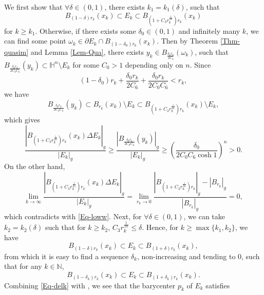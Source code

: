 \documentclass[11pt,reqno]{amsart}
\theoremstyle{definition}
\theoremstyle{remark}
\numberwithin{equation}{section}
\renewcommand{\(}{\left(}
\renewcommand{\)}{\right)}
\renewcommand{\-}{\overline}
\begin{document}
 We first show that $\forall \delta\in(0,1)$, there exists $k_1=k_1(\delta)$, such that 
 \begin{equation}
 	B_{(1-\delta)r_k}(x_k)\subset E_k\subset  B_{(1+C_3 r_k^{\frac{1}{2n}})r_k}(x_k)
 \end{equation}
 for $k\geq k_1$. Otherwise, if there exists some $\delta_0\in(0,1)$ and infinitely many $k$, we can find some point $\omega_k\in\partial E_k\cap B_{(1-\delta_0)r_k}(x_k)$. Then by Theorem \ref{Thm-quasim} and Lemma \ref{Lem-Qua}, there exists $y_k\in B_{\frac{\delta_0 r_k}{2C_6}}(\omega_k)$, such that $B_{\frac{\delta_0 r_k}{2C_0C_6}}(y_k)\subset\mathbb{H}^n\setminus E_k$ for some $C_0>1$ depending only on $n$. Since 
\begin{equation*}
	(1-\delta_0)r_k+\frac{\delta_0 r_k}{2C_6}+\frac{\delta_0 r_k}{2C_0C_6}<r_k,
\end{equation*}
we have 
\begin{equation*}
	B_{\frac{\delta_0 r_k}{2C_0C_6}}(y_k)\subset B_{r_k}(x_k)\setminus {E_k}\subset B_{(1+C_3 r_k^{\frac{1}{2n}})r_k}(x_k)\setminus E_k,
\end{equation*}
which gives
\begin{equation}\label{Eq-loww}
	\frac{\left|B_{(1+C_3 r_k^{\frac{1}{2n}})r_k}(x_k)\Delta E_k\right|_g}{|E_k|_g}\geq \frac{\left|B_{\frac{\delta_0 r_k}{2C_0C_6}}(y_k)\right|_g}{|E_k|_g}\geq\left(\frac{\delta_0}{2C_0C_6\cosh 1}\right)^n>0.
\end{equation}
On the other hand, 
\begin{equation*}
	\lim_{k\to\infty}\frac{\left|B_{(1+C_3 r_k^{\frac{1}{2n}})r_k}(x_k)\Delta E_k\right|_g}{|E_k|_g}=\lim_{r_k\to 0}\frac{\left|B_{(1+C_3 r_k^{\frac{1}{2n}})r_k}\right|_g-\left|B_{r_k}\right|_g}{|B_{r_k}|_g}=0,
\end{equation*}
which contradicts with \eqref{Eq-loww}. Next, for $\forall\delta\in(0,1)$, we can take $k_2=k_2(\delta)$ such that for $k\geq k_2$, $C_3 r_k^{\frac{1}{2n}}\leq\delta$. Hence, for $k\geq\max\{k_1,k_2\}$, we have
\begin{equation}\label{Eq-incl}
	B_{(1-\delta)r_k}(x_k)\subset E_k\subset  B_{(1+\delta)r_k}(x_k),
\end{equation}
from which it is easy to find a sequence $\delta_k$, non-increasing and tending to $0$, such that for any $k\in\mathbb{N}$,
\begin{equation}\label{Eq-delk}
		B_{(1-\delta_k)r_k}(x_k)\subset E_k\subset  B_{(1+\delta_k)r_k}(x_k).
\end{equation}
Combining \eqref{Eq-delk} with \cite[Lemma 2.6]{Bogelein15}, we see that the barycenter $p_k$ of $E_k$ satisfies
\end{document}
